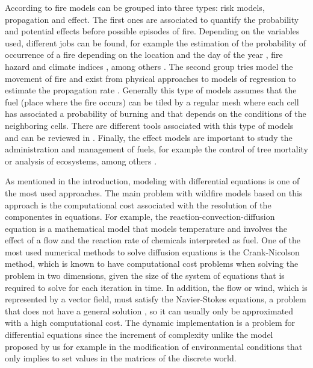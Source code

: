 \documentclass[conference]{IEEEtran}
\begin{document}
    According to \cite{preisler2013forest} fire models can be grouped into three types: risk models, 
    propagation and effect. The first ones are associated to quantify the probability and potential effects before
    possible episodes of fire. Depending on the variables used, different jobs can be found, for example
    the estimation of the probability of occurrence of a fire depending on the location and the day of the year
    \cite{brillinger2003risk, hernandez2010integrating}, fire hazard and climate indices \cite{van1987development,
    burgan19881988}, among others \cite{braun2010forest, ager2007modeling, calkin2011comparative}. The second group tries
    model the movement of fire and exist from physical approaches \cite{rothermel1972mathematical} to models of
    regression to estimate the propagation rate \cite{sullivan2009wildland}. Generally this type of models assumes that
    the fuel (place where the fire occurs) can be tiled by a regular mesh where each cell has
    associated a probability of burning and that depends on the conditions of the neighboring cells. There are different
    tools associated with this type of models and can be reviewed in \cite{andrews1986behave, finney2006overview,
    finney1998farsite, finney2011simulation, finney2011method}. Finally, the effect models are important
    to study the administration and management of fuels, for example the control of tree mortality
    or analysis of ecosystems, among others \cite{Larkin-2009, reinhardt2003using, robichaud2007predicting}. \medskip
    
    As mentioned in the introduction, modeling with differential equations is one of the most used approaches. 
    The main problem with wildfire models based on this approach is the computational cost associated with the 
    resolution of the componentes in equations. For example, the reaction-convection-diffusion equation \cite{liu2009elementary} is 
    a mathematical model that models temperature and involves the effect of a flow and the reaction rate of 
    chemicals interpreted as fuel. One of the most used numerical methods to solve diffusion equations is the 
    Crank-Nicolson method, which is known to have computational cost problems when solving the problem in two 
    dimensions, given the size of the system of equations that is required to solve for each iteration in time. 
    In addition, the flow or wind, which is represented by a vector field, must satisfy the Navier-Stokes 
    equations, a problem that does not have a general solution \cite{fefferman2006existence}, so it can usually 
    only be approximated with a high computational cost. The dynamic implementation is a problem for differential
    equations since the increment of complexity unlike the model proposed by us for example in the modification
    of environmental conditions that only implies to set values in the matrices of the discrete world. \medskip
    
\end{document}

